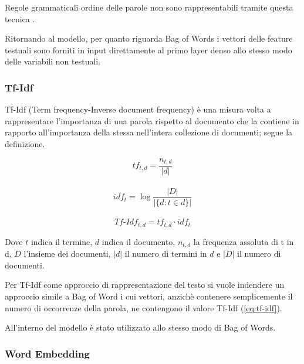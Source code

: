 Regole grammaticali ordine delle parole non sono rappresentabili
tramite questa tecnica \cite{manning_raghavan_schutze_2008}.

Ritornando al modello, per quanto riguarda Bag of Words i vettori delle feature
testuali sono forniti in input direttamente al primo layer denso allo stesso
modo delle variabili non testuali.

\subsubsection{Tf-Idf}\label{section-tfidf} Tf-Idf (Term frequency-Inverse
document frequency) \cite{manning_raghavan_schutze_2008} è una misura volta a
rappresentare l'importanza di una parola rispetto al documento che la contiene
in rapporto all'importanza della stessa nell'intera collezione di documenti;
segue la definizione.%

\begin{equation}
	\label{eq:tf}
	tf_{t,d} = \frac{n_{t,d}}{|d|}
\end{equation}
\\
\begin{equation}
	\label{eq:idf}
	idf_{t} = \log \frac{|D|}{|\{d: t \in d\}|}
\end{equation}
\\
\begin{equation}
	\label{eq:tf-idf}
	Tf\mbox{-}Idf_{t,d} = tf_{t,d} \cdot idf_t
\end{equation}

Dove $t$ indica il termine, $d$
indica il documento, $n_{t,d}$ la frequenza assoluta di t in d, $D$ l'insieme
dei documenti, $|d|$ il numero di termini in $d$ e $|D|$ il numero di documenti.

Per Tf-Idf come approccio di rappresentazione del testo si vuole indendere un
approccio simile a Bag of Word i cui vettori, anzichè contenere semplicemente il
numero di occorrenze della parola, ne contengono il valore Tf-Idf
(\ref{eq:tf-idf}).

All'interno del modello è stato utilizzato allo stesso modo di Bag
of Words.



\subsubsection{Word Embedding}

